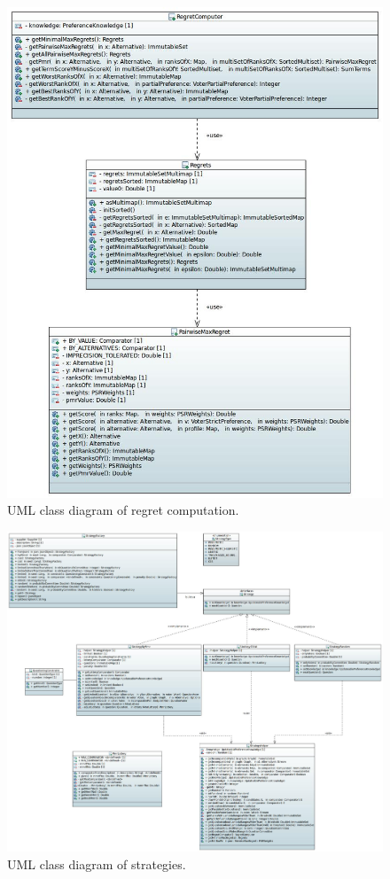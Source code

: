 \begin{figure}[h]
	\centering
	\includegraphics[width=\textwidth]{uml/regret.jpeg}
	\caption{UML class diagram of regret computation.}
\end{figure}

\begin{figure}
	\centering
	\includegraphics[width=\textwidth]{uml/strategies.jpeg}
	\caption{UML class diagram of strategies.}
\end{figure}

